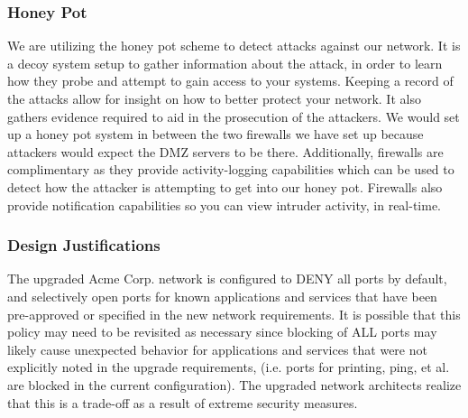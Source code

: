 \begin{center}
\vspace{2.5em}



\end{center}

\subsubsection{Honey Pot}
We are utilizing the honey pot scheme to detect attacks against our network. It
is a decoy system setup to gather information about the attack, in order to
learn how they probe and attempt to gain access to your systems. Keeping a
record of the attacks allow for insight on how to better protect your network.
It also gathers evidence required to aid in the prosecution of the
attackers. We would set up a honey pot system in between the two firewalls we
have set up because attackers would expect the DMZ servers to be there.
Additionally, firewalls are complimentary as they provide activity-logging
capabilities which can be used to detect how the attacker is attempting to get
into our honey pot. Firewalls also provide notification capabilities so you can
view intruder activity, in real-time.

\subsubsection{Design Justifications}
The upgraded Acme Corp. network is configured to DENY all ports by default, and
selectively open ports for known applications and services that have been
pre-approved or specified in the new network requirements. It is possible that
this policy may need to be revisited as necessary since blocking of ALL ports 
may likely cause unexpected behavior for applications and services that were 
not explicitly noted in the upgrade requirements, (i.e. ports for printing, 
ping, et al. are blocked in the current configuration). The upgraded network
architects realize that this is a trade-off as a result of extreme security 
measures.

